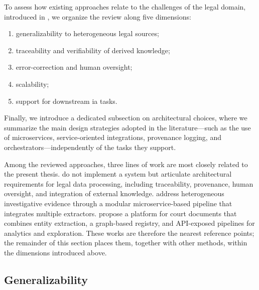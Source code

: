 To assess how existing approaches relate to the challenges of the legal domain, introduced in , we organize the review along five dimensions:
\begin{enumerate}
    \item generalizability to heterogeneous legal sources;
    \item traceability and verifiability of derived knowledge;
    \item error-correction and human oversight;
    \item scalability;
    \item support for downstream \acl{ia} tasks.
\end{enumerate}
Finally, we introduce a dedicated subsection on architectural choices, where we summarize the main design strategies adopted in the literature---such as the use of microservices, service-oriented integrations, provenance logging, and orchestrators---independently of the tasks they support.

Among the reviewed approaches, three lines of work are most closely related to the present thesis. \textcite{breit_legal_permits_2020} do not implement a system but articulate architectural requirements for legal data processing, including traceability, provenance, human oversight, and integration of external knowledge. \textcite{P_rez_2021} address heterogeneous investigative evidence through a modular microservice-based pipeline that integrates multiple extractors. \textcite{bellandi2025streamlining} propose a platform for court documents that combines entity extraction, a graph-based registry, and API-exposed pipelines for analytics and exploration. These works are therefore the nearest reference points; the remainder of this section places them, together with other methods, within the dimensions introduced above.

\subsection{Generalizability}

